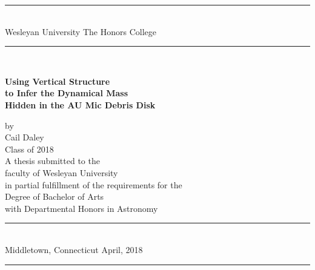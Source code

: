 \pagestyle{empty}
\begin{titlepage}
\begin{center}
\rule{5.75in}{1pt} \\
\vspace*{-0.125in}
{\large \doublespacing Wesleyan University} \hfill {\large \doublespacing The Honors College}
\rule[0.2in]{5.75in}{1pt} \\
\vspace*{0.8in}

{\LARGE \singlespacing \bf 
  Using Vertical Structure \\
  to Infer the Dynamical Mass \\ 
  Hidden in the AU Mic Debris Disk
  } \\
\vspace*{0.05in}
\vspace*{0.10in}

{\large \vspace*{0.20in}  \singlespacing by \vspace*{.2in}
\\Cail Daley \\ Class of 2018\\}
\vspace*{0.25in}
\vspace*{0.8in}
{\large \singlespacing A thesis submitted to the\\ faculty of Wesleyan University\\ in partial fulfillment of the requirements for the \\ Degree of Bachelor of Arts\\ with Departmental Honors in Astronomy\\ \vspace*{-0.15in} }
\vspace*{.25in}
\rule{5.75in}{1pt} \\
\vspace*{-0.125in}
{\large \doublespacing Middletown, Connecticut \hfill April, 2018}
\rule[0.2in]{5.75in}{1pt} 
\end{center}
\end{titlepage}

